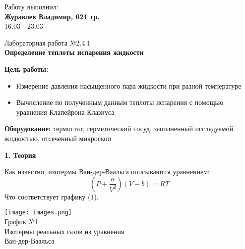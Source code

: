 \documentclass[12pt,a4paper]{article}
\author{Владимир Журавлев}
\begin{document}
\begin{flushright}
Работу выполнил:\\
\textbf{Журавлев Владимир, 621 гр.\\}
16.03 - 23.03

\end{flushright}
\begin{center}
\begin{LARGE}

\vspace{\baselineskip}
Лабораторная работа №2.4.1\\
\textbf{Определение теплоты испарения жидкости}\\
\vspace{\baselineskip}

\end{LARGE}
\end{center}

\noindent\textbf{Цель работы:} 
\begin{itemize}
\item Измерение давления насыщенного пара жидкости при разной температуре
\item Вычисление по полученным данным теплоты испарения с помощью уравнения Клапейрона-Клазиуса
\end{itemize}
\textbf{Оборудование:} термостат, герметический сосуд, заполненный исследуемой жидкостью, отсеченный микроскоп\\

\begin{Large}
\begin{center}
\textbf{1. Теория}\\
\end{center}
\end{Large}

Как известно, изотермы Ван-дер-Ваальса описываются уравнением:
\begin{equation}
(P+\frac{\alpha}{V^2})(V-b) =  RT
\end{equation}
Что соответствует графику (1).\\
\begin{minipage}{\textwidth}
        \begin{center}
        \texttt{[image: images.png]}\\
        График №1\\
        Изотермы реальных газов из уравнения \\
        Ван-дер-Ваальса\\
        \end{center}  
\end{minipage}
\end{document}
